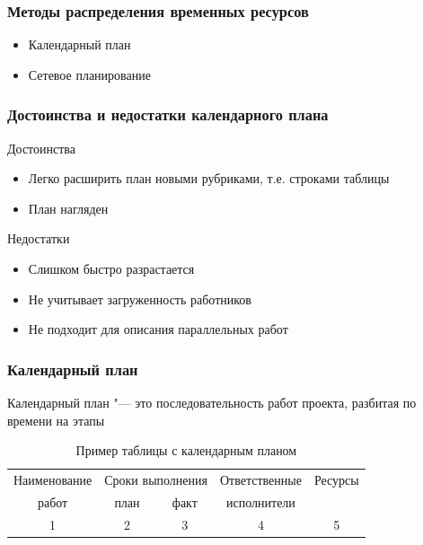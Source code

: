 \documentclass{../industrial-development}
\newcommand{\sz}{\footnotesize}
\begin{document}
    \begin{frame} \frametitle{Методы распределения временных ресурсов}
        \begin{itemize}
            \item Календарный план
            \item Сетевое планирование
        \end{itemize}
    \end{frame}
    
    \begin{frame} \frametitle{Достоинства и недостатки календарного плана}
        \begin{block}{Достоинства}
            \begin{itemize}
                \item Легко расширить план новыми рубриками, т.е. строками таблицы
                \item План нагляден
            \end{itemize}
        \end{block}
        \begin{block}{Недостатки}
            \begin{itemize}
                \item Слишком быстро разрастается
                \item Не учитывает загруженность работников
                \item Не подходит для описания параллельных работ
            \end{itemize}
        \end{block}
    \end{frame}
  
    \begin{frame} \frametitle{Календарный план}
        \begin{definition}
            Календарный план "--- это последовательность работ проекта, разбитая по времени на этапы
        \end{definition}
        \begin{table}
            \caption{Пример таблицы с календарным планом}
            \center
            \begin{tabular}{ccccc}
                \hline
                \sz Наименование & \multicolumn{2}{c}{\sz Сроки выполнения\phantom{000}} & \sz Ответственные & \sz Ресурсы \\
                \sz работ & \sz план & \sz факт & \sz исполнители &  \\
                \hline
                1 & 2 & 3 & 4 & 5 \\
                \hline
            \end{tabular}
        \end{table}
    \end{frame}
\end{document}
